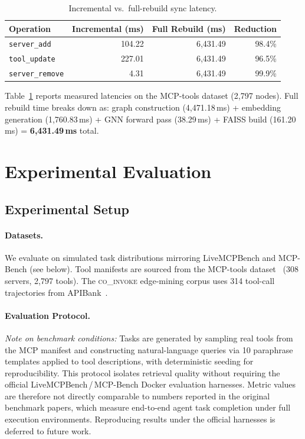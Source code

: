 \documentclass[conference]{IEEEtran}
\begin{document}
\begin{table}[htbp]
\centering
\caption{Incremental vs.\ full-rebuild sync latency.}
\label{tab:sync_latency}
\begin{tabular}{lrrr}
\toprule
Operation & Incremental (ms) & Full Rebuild (ms) & Reduction \\
\midrule
\texttt{server\_add}    & 104.22 & 6,431.49 & 98.4\% \\
\texttt{tool\_update}   & 227.01 & 6,431.49 & 96.5\% \\
\texttt{server\_remove} & 4.31   & 6,431.49 & 99.9\% \\
\bottomrule
\end{tabular}
\end{table}

Table~\ref{tab:sync_latency} reports measured latencies on the
MCP-tools dataset (2,797 nodes). Full rebuild time breaks down as:
graph construction (4,471.18\,ms) + embedding generation (1,760.83\,ms) +
GNN forward pass (38.29\,ms) + FAISS build (161.20\,ms) =
\textbf{6,431.49\,ms} total.


\section{Experimental Evaluation}

\subsection{Experimental Setup}

\paragraph{Datasets.}
We evaluate on simulated task distributions mirroring LiveMCPBench
and MCP-Bench (see below). Tool manifests are sourced from the
MCP-tools dataset~\cite{fei2025mcpzero} (308 servers, 2,797 tools).
The \textsc{co\_invoke} edge-mining corpus uses 314 tool-call
trajectories from APIBank~\cite{li2023apibank}.

\paragraph{Evaluation Protocol.}
\emph{Note on benchmark conditions:} Tasks are generated by sampling
real tools from the MCP manifest and constructing natural-language
queries via 10 paraphrase templates applied to tool descriptions,
with deterministic seeding for reproducibility. This protocol
isolates retrieval quality without requiring the official
LiveMCPBench\,/\,MCP-Bench Docker evaluation harnesses. Metric
values are therefore not directly comparable to numbers reported in
the original benchmark papers, which measure end-to-end agent task
completion under full execution environments. Reproducing results
under the official harnesses is deferred to future work.
\end{document}
